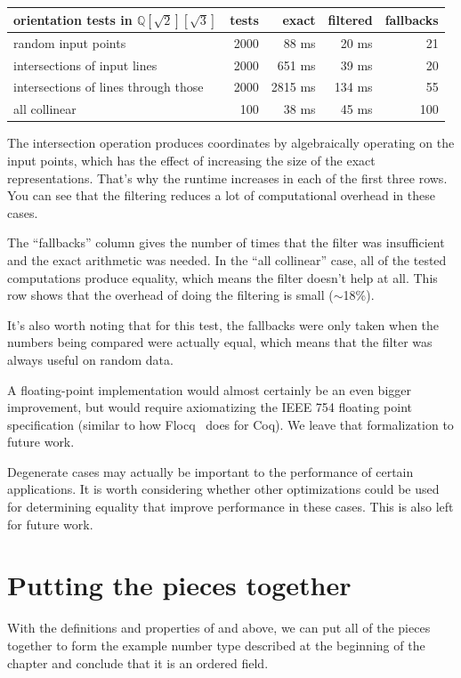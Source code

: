 \begin{center}
\begin{tabular}{lrrrr}
  \hline
  orientation tests in $ℚ[\sqrt{2}][\sqrt{3}]$ & tests & exact & filtered & fallbacks \\
  \hline
  random input points & 2000 & 88 ms & 20 ms & 21 \\
  intersections of input lines & 2000 & 651 ms & 39 ms & 20 \\
  intersections of lines through those & 2000 & 2815 ms & 134 ms & 55 \\
  all collinear & 100 & 38 ms & 45 ms & 100 \\
  \hline
\end{tabular}
\end{center}
The intersection operation produces coordinates by algebraically operating on
the input points, which has the effect of increasing the size of the exact
representations. That's why the runtime increases in each of the first three
rows. You can see that the filtering reduces a lot of computational overhead in
these cases.

The ``fallbacks'' column gives the number of times that the filter was
insufficient and the exact arithmetic was needed. In the ``all collinear'' case,
all of the tested computations produce equality, which means the filter doesn't
help at all. This row shows that the overhead of doing the filtering is small
($\sim$18\%).

It's also worth noting that for this test, the fallbacks were only taken when
the numbers being compared were actually equal, which means that the filter was
always useful on random data.

A floating-point implementation would almost certainly be an even bigger
improvement, but would require axiomatizing the IEEE 754 floating point
specification (similar to how Flocq~\cite{flocq} does for Coq). We leave that
formalization to future work.

Degenerate cases may actually be important to the performance of certain
applications. It is worth considering whether other optimizations could be used
for determining equality that improve performance in these cases. This is also
left for future work.

\section{Putting the pieces together}
\label{sec:numberType}

With the definitions and properties of  and 
above, we can put all of the pieces together to form the example number type
described at the beginning of the chapter and conclude that it is an ordered
field.

